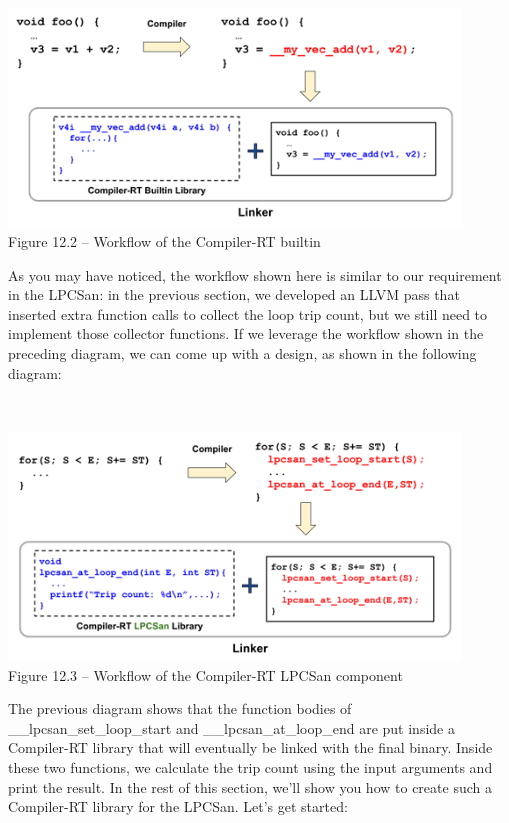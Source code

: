 \hspace*{\fill} \\ %
\begin{center}
\includegraphics[width=0.9\textwidth]{content/3/chapter12/images/2.png}\\
Figure 12.2 – Workflow of the Compiler-RT builtin
\end{center}

As you may have noticed, the workflow shown here is similar to our requirement in the LPCSan: in the previous section, we developed an LLVM pass that inserted extra function calls to collect the loop trip count, but we still need to implement those collector functions. If we leverage the workflow shown in the preceding diagram, we can come up with a design, as shown in the following diagram:

\hspace*{\fill} \\ %
\begin{center}
\includegraphics[width=0.9\textwidth]{content/3/chapter12/images/3.png}\\
Figure 12.3 – Workflow of the Compiler-RT LPCSan component
\end{center}

The previous diagram shows that the function bodies of \_\_lpcsan\_set\_loop\_start and \_\_lpcsan\_at\_loop\_end are put inside a Compiler-RT library that will eventually be linked with the final binary. Inside these two functions, we calculate the trip count using the input arguments and print the result. In the rest of this section, we'll show you how to create such a Compiler-RT library for the LPCSan. Let's get started:

